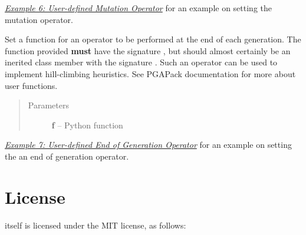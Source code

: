 \documentclass[letterpaper,11pt,english]{sphinxmanual}
\begin{document}
\begin{fulllineitems}
\begin{fulllineitems}
\begin{quote}
\begin{description}
\end{description}\end{quote}




{\hyperref[examples:sec-mutationexamples]{\emph{Example 6: User-defined Mutation Operator}}} for an example on setting the mutation
operator.



\end{fulllineitems}


\begin{fulllineitems}
\label{api_reference:PGA.SetEndOfGen}
Set a function for an operator to be performed at the end of each
generation.  The function  provided
\textbf{must} have the signature , but should almost certainly
be an inerited class member with the signature .
Such an operator can be used to implement hill-climbing heuristics.
See PGAPack documentation for more about user functions.
\begin{quote}\begin{description}
\item[{Parameters}] \leavevmode
\textbf{f} -- Python function

\end{description}\end{quote}




{\hyperref[examples:sec-endofgenexamples]{\emph{Example 7: User-defined End of Generation Operator}}} for an example on setting the an end of
generation operator.



\end{fulllineitems}


\end{fulllineitems}



\chapter{License}
\label{license:sec-license}\label{license::doc}\label{license:license}
 itself is licensed under the MIT license, as follows:
\end{document}
